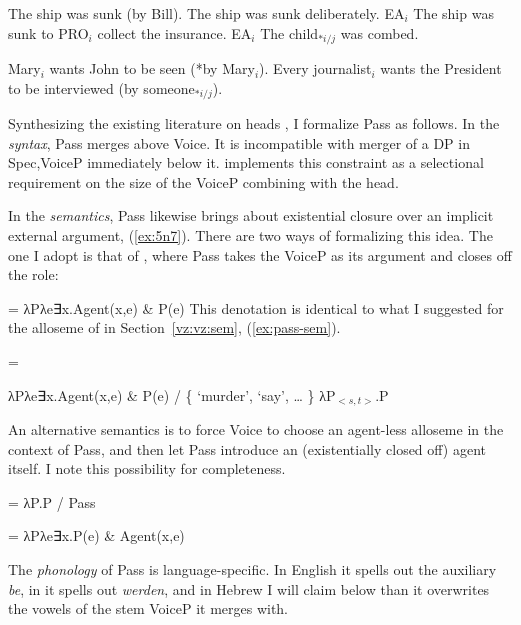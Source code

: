 \begin{exe}
\begin{xlist}
 \begin{exe}
\ex  \label{ex:pass-by-en}The ship was sunk (by Bill). 
\ex  \label{ex:pass-adv-en}The ship was sunk deliberately. 
\ex  \label{ex:pass-pro-en}EA$_i$ The ship was sunk to PRO$_i$ collect the insurance. 
\ex  \label{ex:pass-dre-en}EA$_i$ The child$_{*i/j}$ was combed. 
\ex  \label{ex:pass-bind-en} 
 \begin{xlist} 
 	\ex  Mary$_i$ wants John to be seen (*by Mary$_i$). 
 	\ex  Every journalist$_i$ wants the President to be interviewed (by someone$_{*i/j}$). 
 \z
\z 

Synthesizing the existing literature on  heads \citep{bruening13,layering15}, I formalize Pass as follows. In the \textit{syntax}, Pass merges above Voice. It is incompatible with merger of a DP in Spec,VoiceP immediately below it. \cite{bruening13} implements this constraint as a selectional requirement on the size of the VoiceP combining with the  head.

In the \textit{semantics}, Pass likewise brings about existential closure over an implicit external argument, (\ref{ex:5n7}). There are two ways of formalizing this idea. The one I adopt is that of \cite{bruening13}, where Pass takes the VoiceP as its argument and closes off the  role:

 \begin{exe}
\ex  \label{ex:5n7} = λPλe∃x.Agent(x,e) \& P(e) 
 \z 
This denotation is identical to what I suggested for the  alloseme of {\vz} in Section~\ref{vz:vz:sem}, (\ref{ex:pass-sem}).
 \begin{exe}
	\ex  \label{ex:pass-sem}\denote{\vz} = 
	\begin{xlist}
		\ex λPλe∃x.Agent(x,e) \& P(e) / \{ `murder',  ‘say’, {\dots} \} 
		\ex λP$_{<s,t>}$.P
		\z
	\z 

An alternative semantics is to force Voice to choose an agent-less alloseme in the context of Pass, and then let Pass introduce an (existentially closed off) agent itself. I note this possibility for completeness.

 \begin{exe}
\ex  {} = λP.P / Pass \trace 

\ex  {} = λPλe∃x.P(e) \& Agent(x,e) 
 \z 

The \textit{phonology} of Pass is language-specific. In English it spells out the auxiliary \emph{be}, in  it spells out \emph{werden}, and in Hebrew I will claim below than it overwrites the vowels of the stem VoiceP it merges with.



\end{exe}
\end{xlist}
\end{exe}
\end{exe}
\end{xlist}
\end{exe}
\end{xlist}
\end{exe}

